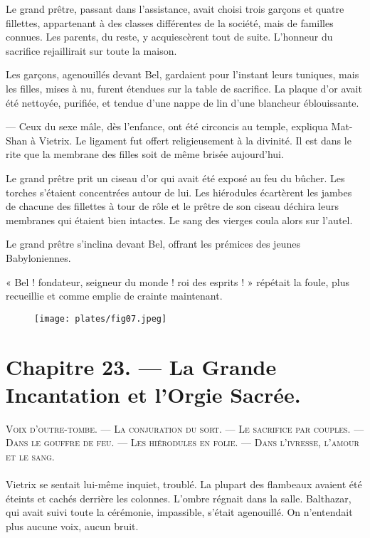 \documentclass[a4paper, 11pt, oneside, polutonikogreek, french]{article}
\begin{document}
Le grand prêtre, passant dans l'assistance, avait choisi trois garçons et quatre fillettes, appartenant à des classes différentes de la société, mais de familles connues. Les parents, du reste, y acquiescèrent tout de suite. L'honneur du sacrifice rejaillirait sur toute la maison.

\bigskip
\centerline{\EightStarTaper}
\centerline{\EightStarTaper\EightStarTaper}
\bigskip

Les garçons, agenouillés devant Bel, gardaient pour l'instant leurs tuniques, mais les filles, mises à nu, furent étendues sur la table de sacrifice. La plaque d'or avait été nettoyée, purifiée, et tendue d'une nappe de lin d'une blancheur éblouissante.

--- Ceux du sexe mâle, dès l'enfance, ont été circoncis au temple, expliqua Mat-Shan à Vietrix. Le ligament fut offert religieusement à la divinité. Il est dans le rite que la membrane des filles soit de même brisée aujourd'hui.

Le grand prêtre prit un ciseau d'or qui avait été exposé au feu du bûcher. Les torches s'étaient concentrées autour de lui. Les hiérodules écartèrent les jambes de chacune des fillettes à tour de rôle et le prêtre de son ciseau déchira leurs membranes qui étaient bien intactes. Le sang des vierges coula alors sur l'autel.

Le grand prêtre s'inclina devant Bel, offrant les prémices des jeunes Babyloniennes.

« Bel ! fondateur, seigneur du monde ! roi des esprits ! » répétait la foule, plus recueillie et comme emplie de crainte maintenant.
\clearpage
\begin{figure}[H]
\centering
\texttt{[image: plates/fig07.jpeg]}
\end{figure}
\section{Chapitre 23. --- La Grande Incantation et l'Orgie Sacrée.}
\begin{center}
\scshape
\small
Voix d'outre-tombe. --- La conjuration du sort. --- Le sacrifice par couples. --- Dans le gouffre de feu. --- Les hiérodules en folie. --- Dans l'ivresse, l'amour et le sang.
\end{center}
\paragraph{}
Vietrix se sentait lui-même inquiet, troublé. La plupart des flambeaux avaient été éteints et cachés derrière les colonnes. L'ombre régnait dans la salle. Balthazar, qui avait suivi toute la cérémonie, impassible, s'était agenouillé. On n'entendait plus aucune voix, aucun bruit.
\end{document}
